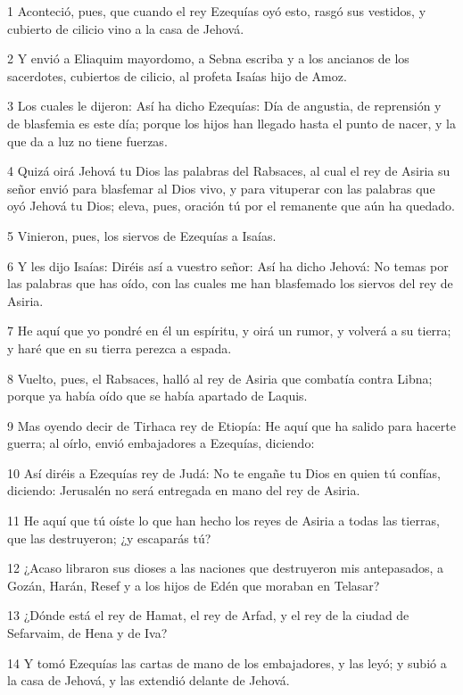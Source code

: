 \par 1 Aconteció, pues, que cuando el rey Ezequías oyó esto, rasgó sus vestidos, y cubierto de cilicio vino a la casa de Jehová.
\par 2 Y envió a Eliaquim mayordomo, a Sebna escriba y a los ancianos de los sacerdotes, cubiertos de cilicio, al profeta Isaías hijo de Amoz.
\par 3 Los cuales le dijeron: Así ha dicho Ezequías: Día de angustia, de reprensión y de blasfemia es este día; porque los hijos han llegado hasta el punto de nacer, y la que da a luz no tiene fuerzas.
\par 4 Quizá oirá Jehová tu Dios las palabras del Rabsaces, al cual el rey de Asiria su señor envió para blasfemar al Dios vivo, y para vituperar con las palabras que oyó Jehová tu Dios; eleva, pues, oración tú por el remanente que aún ha quedado.
\par 5 Vinieron, pues, los siervos de Ezequías a Isaías.
\par 6 Y les dijo Isaías: Diréis así a vuestro señor: Así ha dicho Jehová: No temas por las palabras que has oído, con las cuales me han blasfemado los siervos del rey de Asiria.
\par 7 He aquí que yo pondré en él un espíritu, y oirá un rumor, y volverá a su tierra; y haré que en su tierra perezca a espada.
\par 8 Vuelto, pues, el Rabsaces, halló al rey de Asiria que combatía contra Libna; porque ya había oído que se había apartado de Laquis.
\par 9 Mas oyendo decir de Tirhaca rey de Etiopía: He aquí que ha salido para hacerte guerra; al oírlo, envió embajadores a Ezequías, diciendo:
\par 10 Así diréis a Ezequías rey de Judá: No te engañe tu Dios en quien tú confías, diciendo: Jerusalén no será entregada en mano del rey de Asiria.
\par 11 He aquí que tú oíste lo que han hecho los reyes de Asiria a todas las tierras, que las destruyeron; ¿y escaparás tú?
\par 12 ¿Acaso libraron sus dioses a las naciones que destruyeron mis antepasados, a Gozán, Harán, Resef y a los hijos de Edén que moraban en Telasar?
\par 13 ¿Dónde está el rey de Hamat, el rey de Arfad, y el rey de la ciudad de Sefarvaim, de Hena y de Iva?
\par 14 Y tomó Ezequías las cartas de mano de los embajadores, y las leyó; y subió a la casa de Jehová, y las extendió delante de Jehová. 
